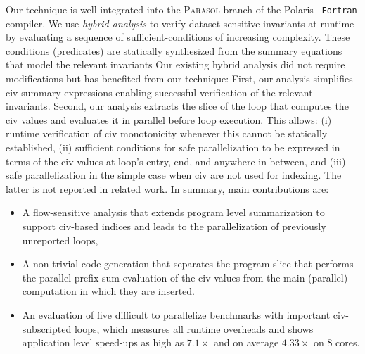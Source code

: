 \documentclass[10pt,nocopyrightspace]{sigplanconf}
\begin{document}
Our technique is well integrated %
into the \textsc{Parasol} branch of the Polaris~\cite{Blume94automaticdetection} 
{\tt Fortran} compiler. We  use {\em hybrid analysis} to
verify dataset-sensitive invariants %
at runtime by evaluating a sequence of sufficient-conditions 
 of increasing complexity.
These conditions (predicates) are statically synthesized from the summary 
equations that model the relevant invariants 
%
Our existing hybrid analysis did not require modifications
but has benefited from our technique: 
%
First, our analysis simplifies {\sc civ}-summary expressions
enabling successful verification of the relevant invariants.
Second, our analysis extracts the slice of the loop that computes
the {\sc civ} values and evaluates it in parallel before loop
execution. This allows: 
  (i) runtime verification of {\sc civ} monotonicity whenever 
          this cannot be statically established,  
 (ii) sufficient conditions for safe parallelization to 
          be expressed in terms of the {\sc civ} values at loop's 
          entry, end, and anywhere in between, and 
(iii) safe parallelization in the simple case when
        {\sc civ} are not used for indexing.
The latter is not reported in related work.
%
%
In summary, main contributions are:
\begin{itemize}
    \item A flow-sensitive analysis that extends 
            program level summarization to support {\sc civ}-based 
            indices and leads to the parallelization of
            previously unreported loops, 

    \item A non-trivial code generation that separates the 
            program slice that performs the parallel-prefix-sum
            evaluation of the {\sc civ} values 
            from the main (parallel) computation in which 
            they are inserted.
            
    \item An evaluation of five difficult to parallelize benchmarks 
            with important {\sc civ}-subscripted loops, which measures 
            all runtime overheads and shows application level speed-ups 
            as high as $7.1\times$ and on average $4.33\times$ on $8$ cores.
%
\end  {itemize}
\end{document}
